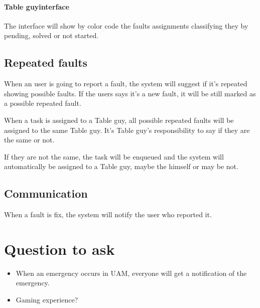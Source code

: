 \documentclass{article}
\newcommand{\tbg}{Table guy}
\begin{document}
\paragraph{\tbg interface}
The interface will show by color code the faults assignments classifying  they by pending, solved or not started.


\subsection{Repeated faults}
When an user is going to report a fault, the system will suggest if it's repeated showing possible faults. If the users says it's a new fault, it will be still marked as a possible repeated fault.

When a task is assigned to a \tbg, all possible repeated faults will be assigned to the same \tbg. It's \tbg's responsibility to say if they are the same or not.

If they are not the same, the task will be enqueued and the system will automatically be assigned to a \tbg, maybe the himself or may be not.


\subsection{Communication}

When a fault is fix, the system will notify the user who reported it.

\section{Question to ask}

\begin{itemize}
\item When an emergency occurs in UAM, everyone will get a notification  of the emergency.
\item Gaming experience?

\end{itemize}
\end{document}
